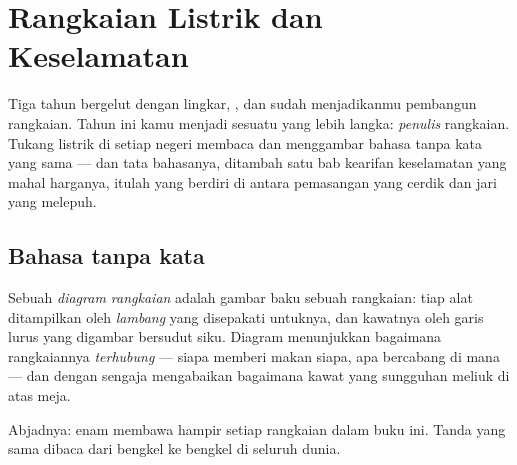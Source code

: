 \chapter{Rangkaian Listrik dan Keselamatan}\label{ch:g6:circuits-and-safety}

Tiga tahun bergelut dengan lingkar, , dan  sudah
menjadikanmu pembangun rangkaian. Tahun ini kamu menjadi sesuatu yang
lebih langka: \emph{penulis} rangkaian. Tukang listrik di setiap
negeri membaca dan menggambar bahasa tanpa kata yang sama --- dan tata
bahasanya, ditambah satu bab kearifan keselamatan yang mahal harganya,
itulah yang berdiri di antara pemasangan yang cerdik dan jari yang
melepuh.

\section{Bahasa tanpa kata}

\begin{definition}\label{def:g6:circuits-and-safety:diagram}
Sebuah \emph{diagram rangkaian} adalah gambar
baku sebuah rangkaian: tiap alat ditampilkan oleh
\emph{lambang} yang disepakati untuknya, dan kawatnya
oleh garis lurus yang digambar bersudut siku. Diagram menunjukkan
bagaimana rangkaiannya \emph{terhubung} --- siapa memberi makan siapa,
apa bercabang di mana --- dan dengan sengaja mengabaikan bagaimana
kawat yang sungguhan meliuk di atas meja.
\end{definition}

\begin{omfigure}

{\small Abjadnya: enam  membawa hampir setiap rangkaian dalam
buku ini. Tanda yang sama dibaca dari bengkel ke bengkel di seluruh
dunia.}
\end{omfigure}

